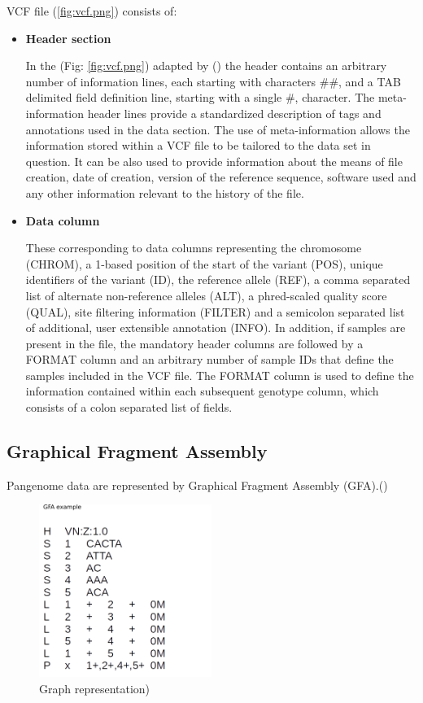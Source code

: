VCF file (\ref{fig:vcf.png}) consists of:
\begin{itemize}

\item\textbf{Header section}

In the (Fig: \ref{fig:vcf.png}) adapted by (\cite{10.1093/bioinformatics/btr330}) the header contains an arbitrary number of information lines, each starting with characters \#\#, and a TAB delimited field definition line, starting with a single \#,
character. The meta-information header lines provide a standardized description of tags and annotations used in the data section. The use of meta-information allows the information stored within a VCF file to be tailored to the data set in question. It can be also used to provide information about the means of file creation, date of creation, version of the reference sequence, software used and any other information relevant to the history of the file. 

\item\textbf{Data column}

These corresponding to data columns representing the chromosome (CHROM), a 1-based position of the start of the variant (POS), unique identifiers of the variant (ID), the reference allele (REF), a comma separated list of alternate non-reference alleles (ALT), a phred-scaled quality score (QUAL), site filtering information (FILTER) and a semicolon separated list of additional, user extensible annotation (INFO). In addition, if samples are present in the file, the mandatory header columns are followed by a FORMAT column and an arbitrary number of sample IDs that define the samples included in the VCF file. The FORMAT column is used to define the information contained within each subsequent genotype column, which consists of a colon separated list of fields.

\end{itemize}


\subsection{Graphical Fragment Assembly}

Pangenome data are represented by Graphical Fragment Assembly (GFA).(\cite{GFA})

\begin{figure}[H]
\centering
\includegraphics[width=0.50\textwidth]{fig/GFAexample.png}
\decoRule
\caption{Graph representation)} 
\label{fig:GFAexample.png}
\end{figure}

